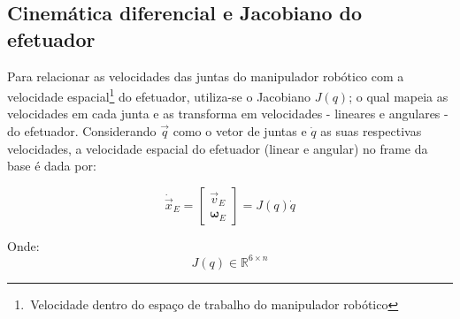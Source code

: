\subsection{Cinemática diferencial e Jacobiano do efetuador}

Para relacionar as velocidades das juntas do manipulador robótico com a velocidade espacial\footnote{\,Velocidade dentro do espaço de trabalho do manipulador robótico} do efetuador, utiliza-se o Jacobiano $J(q)$; o qual mapeia as velocidades em cada junta e as transforma em velocidades - lineares e angulares - do efetuador. Considerando
$\vec q$ como o vetor de juntas e
$\dot{q}$ as suas respectivas velocidades, a velocidade espacial do efetuador (linear e angular) no frame da base é dada por:





\begin{equation}
\label{eq:jac_map_vel1}
\dot{\vec{x}}_{E}=
\begin{bmatrix}
    \vec{v}_{E} \\
    \boldsymbol{\omega}_{E}
\end{bmatrix}
= J(q)\dot{q}
\end{equation}

Onde:
\begin{equation}
    \label{eq:jac_map_vel2}
J(q) \in \mathbb{R}^{6 \times n}
\end{equation}

